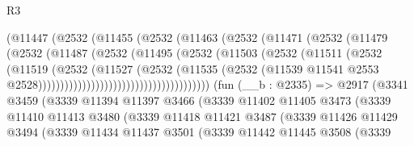 \begin{lexlean}{R3}
\begin{coremodule}
                                (@11447
                                  (@2532
                                    (@11455
                                      (@2532
                                        (@11463
                                          (@2532
                                            (@11471
                                              (@2532
                                                (@11479
                                                  (@2532
                                                    (@11487
                                                      (@2532
                                                        (@11495
                                                          (@2532
                                                            (@11503
                                                              (@2532
                                                                (@11511
                                                                  (@2532
                                                                    (@11519
                                                                      (@2532
                                                                        (@11527
                                                                          (@2532
                                                                            (@11535
                                                                              (@2532
                                                                                (@11539
                                                                                  @11541
                                                                                  @2553
                                                                                  @2528)))))))))))))))))))))))))))))))))))))))
    (fun (__b : @2335) =>
    @2917
      (@3341
        @3459
        (@3339
          @11394
          @11397
          @3466
          (@3339
            @11402
            @11405
            @3473
            (@3339
              @11410
              @11413
              @3480
              (@3339
                @11418
                @11421
                @3487
                (@3339
                  @11426
                  @11429
                  @3494
                  (@3339
                    @11434
                    @11437
                    @3501
                    (@3339
                      @11442
                      @11445
                      @3508
                      (@3339

\end{coremodule}
\end{lexlean}
